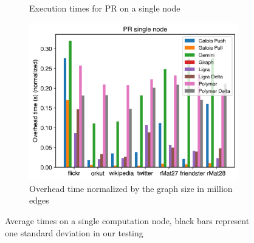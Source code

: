 \begin{figure}
\begin{subfigure}{0.3\textwidth}
		\caption{Execution times for PR on a single node}
		\label{fig:singleNodePR_exec}
	\end{subfigure}
	\hfil
	\begin{subfigure}{0.3\textwidth}
		\includegraphics[width=\linewidth]{../../plots/singleNodePR_overheadTimeNormalized.png}
		\caption{Overhead time normalized by the graph size in million edges}
		\label{fig:singleNodePR_overheadNormalized}
	\end{subfigure}
	
	\caption{Average times on a single computation node, black bars represent one standard deviation in our testing}
\end{figure}




